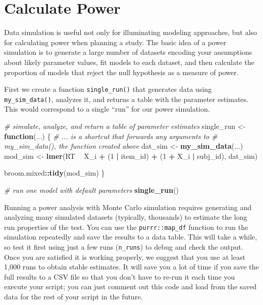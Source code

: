 \documentclass[
  english,
  doc,floatsintext]{apa6}
\newenvironment{Shaded}{\begin{snugshade}}{\end{snugshade}}
\newcommand{\CommentTok}[1]{\textcolor[rgb]{0.56,0.35,0.01}{\textit{#1}}}
\newcommand{\ControlFlowTok}[1]{\textcolor[rgb]{0.13,0.29,0.53}{\textbf{#1}}}
\newcommand{\DecValTok}[1]{\textcolor[rgb]{0.00,0.00,0.81}{#1}}
\newcommand{\KeywordTok}[1]{\textcolor[rgb]{0.13,0.29,0.53}{\textbf{#1}}}
\newcommand{\NormalTok}[1]{#1}
\newcommand{\OperatorTok}[1]{\textcolor[rgb]{0.81,0.36,0.00}{\textbf{#1}}}
\newcommand{\StringTok}[1]{\textcolor[rgb]{0.31,0.60,0.02}{#1}}
\begin{document}
\hypertarget{calculate-power}{%
\section{Calculate Power}\label{calculate-power}}

Data simulation is useful not only for illuminating modeling approaches, but also for calculating power when planning a study. The basic idea of a power simulation is to generate a large number of datasets encoding your assumptions about likely parameter values, fit models to each dataset, and then calculate the proportion of models that reject the null hypothesis as a measure of power.

First we create a function \texttt{single\_run()} that generates data using \texttt{my\_sim\_data()}, analyzes it, and returns a table with the parameter estimates. This would correspond to a single \enquote{run} for our power simulation.

\begin{Shaded}
\begin{Highlighting}[]
\CommentTok{# simulate, analyze, and return a table of parameter estimates}
\NormalTok{single_run <-}\StringTok{ }\ControlFlowTok{function}\NormalTok{(...) \{}
  \CommentTok{# ... is a shortcut that forwards any arguments to }
  \CommentTok{# my_sim_data(), the function created above}
\NormalTok{  dat_sim <-}\StringTok{ }\KeywordTok{my_sim_data}\NormalTok{(...)}
\NormalTok{  mod_sim <-}\StringTok{ }\KeywordTok{lmer}\NormalTok{(RT }\OperatorTok{~}\StringTok{ }\NormalTok{X_i }\OperatorTok{+}\StringTok{ }\NormalTok{(}\DecValTok{1} \OperatorTok{|}\StringTok{ }\NormalTok{item_id) }\OperatorTok{+}\StringTok{ }\NormalTok{(}\DecValTok{1} \OperatorTok{+}\StringTok{ }\NormalTok{X_i }\OperatorTok{|}\StringTok{ }\NormalTok{subj_id),}
\NormalTok{                dat_sim)}
  
\NormalTok{  broom.mixed}\OperatorTok{::}\KeywordTok{tidy}\NormalTok{(mod_sim)}
\NormalTok{\}}
\end{Highlighting}
\end{Shaded}

\begin{Shaded}
\begin{Highlighting}[]
\CommentTok{# run one model with default parameters}
\KeywordTok{single_run}\NormalTok{()}
\end{Highlighting}
\end{Shaded}

Running a power analysis with Monte Carlo simulation requires generating and analyzing many simulated datasets (typically, thousands) to estimate the long run properties of the test. You can use the \texttt{purrr::map\_df} function to run the simulation repeatedly and save the results to a data table. This will take a while, so test it first using just a few runs (\texttt{n\_runs}) to debug and check the output. Once you are satisfied it is working properly, we suggest that you use at least 1,000 runs to obtain stable estimates. It will save you a lot of time if you save the full results to a CSV file so that you don't have to re-run it each time you execute your script; you can just comment out this code and load from the saved data for the rest of your script in the future.
\end{document}
